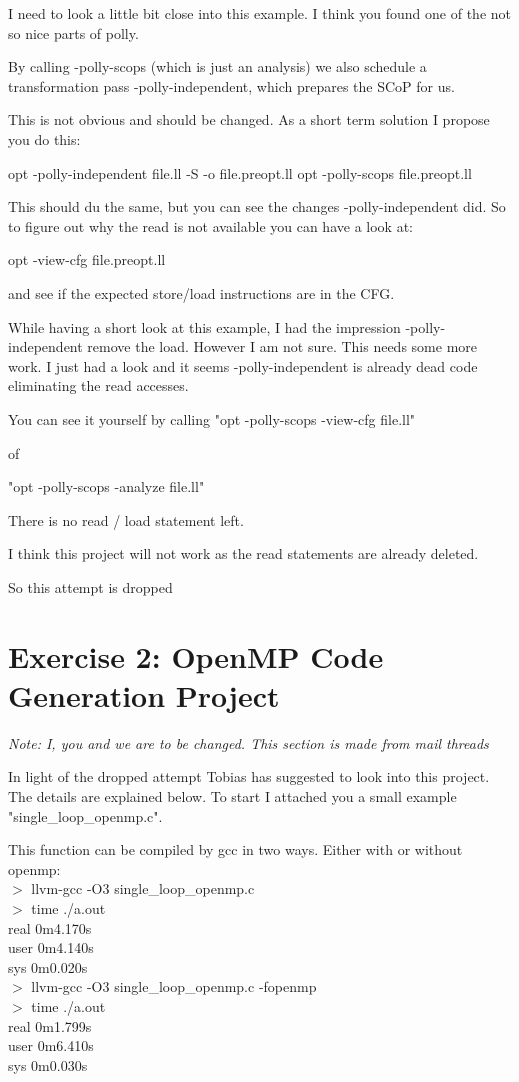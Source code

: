 \documentclass[a4paper,10pt]{article}
\begin{document}
I need to look a little bit close into this example. I think you found one of the not so nice parts of polly.

By calling -polly-scops (which is just an analysis) we also schedule a transformation pass -polly-independent, which prepares the SCoP for us.

This is not obvious and should be changed. As a short term solution I propose you do this:

opt -polly-independent file.ll -S -o file.preopt.ll
opt -polly-scops file.preopt.ll

This should du the same, but you can see the changes -polly-independent did. So to figure out why the read is not available you can have a look at:

opt -view-cfg file.preopt.ll

and see if the expected store/load instructions are in the CFG.

While having a short look at this example, I had the impression -polly-independent remove the load. However I am not sure. This needs some more work.
I just had a look and it seems -polly-independent is already dead code eliminating the read accesses.

You can see it yourself by calling
"opt -polly-scops -view-cfg file.ll"

of

"opt -polly-scops -analyze file.ll"

There is no read / load statement left.

I think this project will not work as the read statements are already deleted.

So this attempt is dropped
\section{Exercise 2: OpenMP Code Generation Project}

\emph{Note: I, you and we are to be changed. This section is made from mail threads}

In light of the dropped attempt Tobias has suggested to look into this project. The details are explained below.
To start I attached you a small example "single\_loop\_openmp.c".

This function can be compiled by gcc in two ways. Either with or without openmp:\\
$>$ llvm-gcc -O3 single\_loop\_openmp.c\\
$>$ time ./a.out\\
real    0m4.170s\\
user    0m4.140s\\
sys     0m0.020s\\
$>$ llvm-gcc -O3 single\_loop\_openmp.c -fopenmp\\
$>$ time ./a.out\\
real    0m1.799s\\
user    0m6.410s\\
sys     0m0.030s\\
\end{document}
